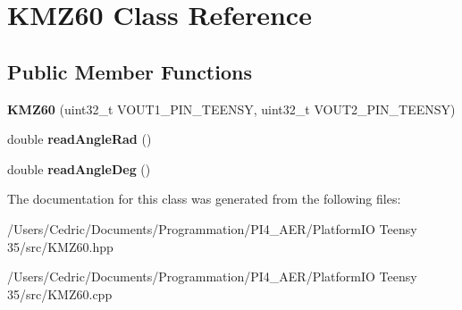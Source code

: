 \hypertarget{class_k_m_z60}{}\section{K\+M\+Z60 Class Reference}
\label{class_k_m_z60}
\subsection*{Public Member Functions}
\begin{DoxyCompactItemize}
\item 
\mbox{\label{class_k_m_z60_a14cd470ddb606123645e8bc2273c9faa}} 
{\bfseries K\+M\+Z60} (uint32\+\_\+t V\+O\+U\+T1\+\_\+\+P\+I\+N\+\_\+\+T\+E\+E\+N\+SY, uint32\+\_\+t V\+O\+U\+T2\+\_\+\+P\+I\+N\+\_\+\+T\+E\+E\+N\+SY)
\item 
\mbox{\label{class_k_m_z60_a6646c434926e9d4928df42c18b626bd8}} 
double {\bfseries read\+Angle\+Rad} ()
\item 
\mbox{\label{class_k_m_z60_a952c4c58499edf11cbfeeff8886b6723}} 
double {\bfseries read\+Angle\+Deg} ()
\end{DoxyCompactItemize}


The documentation for this class was generated from the following files\+:\begin{DoxyCompactItemize}
\item 
/\+Users/\+Cedric/\+Documents/\+Programmation/\+P\+I4\+\_\+\+A\+E\+R/\+Platform\+I\+O Teensy 35/src/K\+M\+Z60.\+hpp\item 
/\+Users/\+Cedric/\+Documents/\+Programmation/\+P\+I4\+\_\+\+A\+E\+R/\+Platform\+I\+O Teensy 35/src/K\+M\+Z60.\+cpp\end{DoxyCompactItemize}
